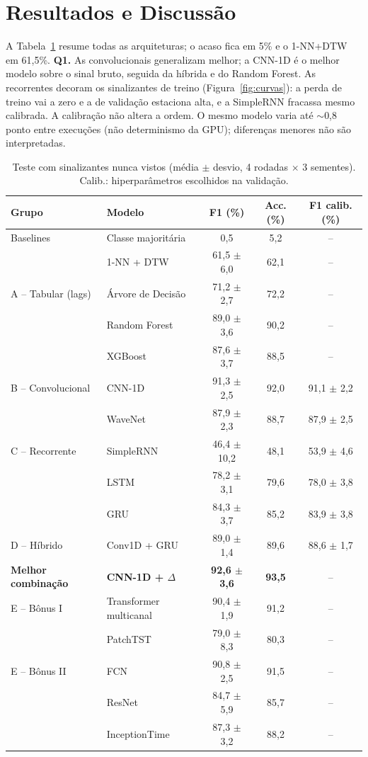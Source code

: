 \documentclass[12pt]{article}
\begin{document}
\section{Resultados e Discussão}

A Tabela~\ref{tab:geral} resume todas as arquiteturas; o acaso fica em 5\% e o 1-NN+DTW em 61,5\%. \textbf{Q1.} As convolucionais generalizam melhor; a CNN-1D é o melhor modelo sobre o sinal bruto, seguida da híbrida e do Random Forest. As recorrentes decoram os sinalizantes de treino (Figura~\ref{fig:curvas}): a perda de treino vai a zero e a de validação estaciona alta, e a SimpleRNN fracassa mesmo calibrada. A calibração não altera a ordem. O mesmo modelo varia até $\sim$0,8 ponto entre execuções (não determinismo da GPU); diferenças menores não são interpretadas.

\begin{table}[!t]
\centering\footnotesize
\caption{Teste com sinalizantes nunca vistos (média $\pm$ desvio, 4 rodadas $\times$ 3 sementes). Calib.: hiperparâmetros escolhidos na validação.}\label{tab:geral}
\begin{tabular}{llccc}
\toprule
Grupo & Modelo & F1 (\%) & Acc. (\%) & F1 calib. (\%) \\
\midrule
Baselines & Classe majoritária & 0{,}5 & 5{,}2 & -- \\
 & 1-NN + DTW & 61{,}5 $\pm$ 6{,}0 & 62{,}1 & -- \\
A -- Tabular (lags) & Árvore de Decisão & 71{,}2 $\pm$ 2{,}7 & 72{,}2 & -- \\
 & Random Forest & 89{,}0 $\pm$ 3{,}6 & 90{,}2 & -- \\
 & XGBoost & 87{,}6 $\pm$ 3{,}7 & 88{,}5 & -- \\
B -- Convolucional & CNN-1D & 91{,}3 $\pm$ 2{,}5 & 92{,}0 & 91{,}1 $\pm$ 2{,}2 \\
 & WaveNet & 87{,}9 $\pm$ 2{,}3 & 88{,}7 & 87{,}9 $\pm$ 2{,}5 \\
C -- Recorrente & SimpleRNN & 46{,}4 $\pm$ 10{,}2 & 48{,}1 & 53{,}9 $\pm$ 4{,}6 \\
 & LSTM & 78{,}2 $\pm$ 3{,}1 & 79{,}6 & 78{,}0 $\pm$ 3{,}8 \\
 & GRU & 84{,}3 $\pm$ 3{,}7 & 85{,}2 & 83{,}9 $\pm$ 3{,}8 \\
D -- Híbrido & Conv1D + GRU & 89{,}0 $\pm$ 1{,}4 & 89{,}6 & 88{,}6 $\pm$ 1{,}7 \\
\textbf{Melhor combinação} & \textbf{CNN-1D + $\Delta$} & \textbf{92{,}6 $\pm$ 3{,}6} & \textbf{93{,}5} & -- \\
\midrule
E -- Bônus I & Transformer multicanal & 90{,}4 $\pm$ 1{,}9 & 91{,}2 & -- \\
 & PatchTST & 79{,}0 $\pm$ 8{,}3 & 80{,}3 & -- \\
E -- Bônus II & FCN & 90{,}8 $\pm$ 2{,}5 & 91{,}5 & -- \\
 & ResNet & 84{,}7 $\pm$ 5{,}9 & 85{,}7 & -- \\
 & InceptionTime & 87{,}3 $\pm$ 3{,}2 & 88{,}2 & -- \\
\bottomrule
\end{tabular}
\end{table}
\end{document}
